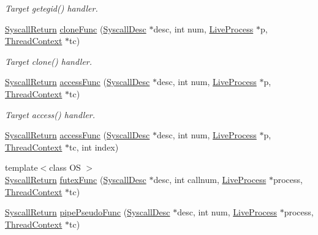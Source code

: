 \begin{DoxyCompactItemize}
\begin{DoxyCompactList}\small\item\em Target getegid() handler. \item\end{DoxyCompactList}\item 
\hyperlink{classSyscallReturn}{SyscallReturn} \hyperlink{syscall__emul_8hh_ab1bb56414754dce4db93e9df10b8c2f7}{cloneFunc} (\hyperlink{classSyscallDesc}{SyscallDesc} $\ast$desc, int num, \hyperlink{classLiveProcess}{LiveProcess} $\ast$p, \hyperlink{classThreadContext}{ThreadContext} $\ast$tc)
\begin{DoxyCompactList}\small\item\em Target clone() handler. \item\end{DoxyCompactList}\item 
\hyperlink{classSyscallReturn}{SyscallReturn} \hyperlink{syscall__emul_8hh_a3a57f406428b5272824549aecc218cff}{accessFunc} (\hyperlink{classSyscallDesc}{SyscallDesc} $\ast$desc, int num, \hyperlink{classLiveProcess}{LiveProcess} $\ast$p, \hyperlink{classThreadContext}{ThreadContext} $\ast$tc)
\begin{DoxyCompactList}\small\item\em Target access() handler. \item\end{DoxyCompactList}\item 
\hyperlink{classSyscallReturn}{SyscallReturn} \hyperlink{syscall__emul_8hh_ad87b62dfcfe55b889d00d3054659a060}{accessFunc} (\hyperlink{classSyscallDesc}{SyscallDesc} $\ast$desc, int num, \hyperlink{classLiveProcess}{LiveProcess} $\ast$p, \hyperlink{classThreadContext}{ThreadContext} $\ast$tc, int index)
\item 
{\footnotesize template$<$class OS $>$ }\\\hyperlink{classSyscallReturn}{SyscallReturn} \hyperlink{syscall__emul_8hh_a0076008fee4a9a049d0ee73b42bd0802}{futexFunc} (\hyperlink{classSyscallDesc}{SyscallDesc} $\ast$desc, int callnum, \hyperlink{classLiveProcess}{LiveProcess} $\ast$process, \hyperlink{classThreadContext}{ThreadContext} $\ast$tc)
\item 
\hyperlink{classSyscallReturn}{SyscallReturn} \hyperlink{syscall__emul_8hh_a58d1892bcde783939ea74a6685ebc68b}{pipePseudoFunc} (\hyperlink{classSyscallDesc}{SyscallDesc} $\ast$desc, int num, \hyperlink{classLiveProcess}{LiveProcess} $\ast$process, \hyperlink{classThreadContext}{ThreadContext} $\ast$tc)
\item 

\end{DoxyCompactItemize}
